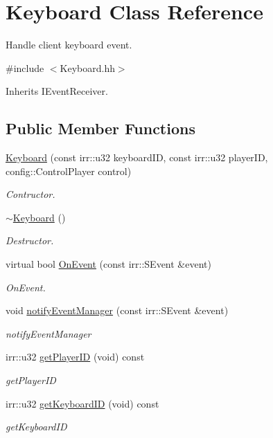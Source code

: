 \hypertarget{classKeyboard}{}\section{Keyboard Class Reference}
\label{classKeyboard}


Handle client keyboard event.  




{\ttfamily \#include $<$Keyboard.\+hh$>$}



Inherits I\+Event\+Receiver.

\subsection*{Public Member Functions}
\begin{DoxyCompactItemize}
\item 
\hyperlink{classKeyboard_abb54d55e7d65dd6ef017352fdf5570c6}{Keyboard} (const irr\+::u32 keyboard\+ID, const irr\+::u32 player\+ID, config\+::\+Control\+Player control)
\begin{DoxyCompactList}\small\item\em Contructor. \end{DoxyCompactList}\item 
\hyperlink{classKeyboard_af6a99ec66c8c722a45b967bf79167038}{$\sim$\+Keyboard} ()
\begin{DoxyCompactList}\small\item\em Destructor. \end{DoxyCompactList}\item 
virtual bool \hyperlink{classKeyboard_ad6974153a0c29b55c1b8765d0d6ccbfa}{On\+Event} (const irr\+::\+S\+Event \&event)
\begin{DoxyCompactList}\small\item\em On\+Event. \end{DoxyCompactList}\item 
void \hyperlink{classKeyboard_a6c6492921a44b4a4ab7e96566381353c}{notify\+Event\+Manager} (const irr\+::\+S\+Event \&event)
\begin{DoxyCompactList}\small\item\em notify\+Event\+Manager \end{DoxyCompactList}\item 
irr\+::u32 \hyperlink{classKeyboard_ac8fe530866f42dd3a62ea66054bc148b}{get\+Player\+ID} (void) const
\begin{DoxyCompactList}\small\item\em get\+Player\+ID \end{DoxyCompactList}\item 
irr\+::u32 \hyperlink{classKeyboard_a8bc4a7d865e268c0d126aa3f0a913bbb}{get\+Keyboard\+ID} (void) const
\begin{DoxyCompactList}\small\item\em get\+Keyboard\+ID \end{DoxyCompactList}\end{DoxyCompactItemize}


